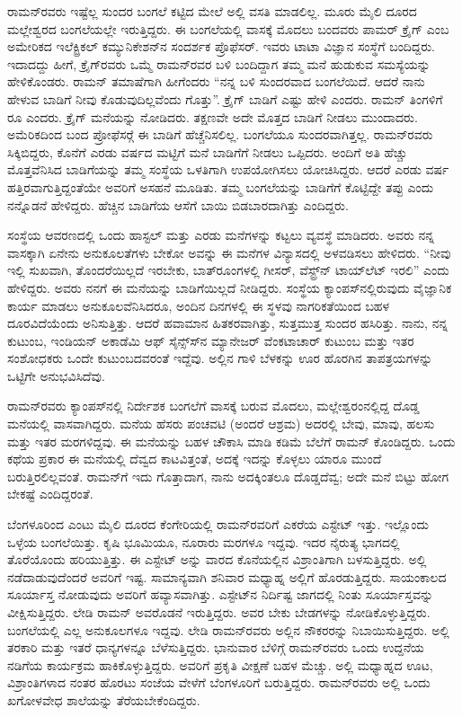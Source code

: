 ರಾಮನ್‍ರವರು ಇಷ್ಟೆಲ್ಲ ಸುಂದರ ಬಂಗಲೆ ಕಟ್ಟಿದ ಮೇಲೆ ಅಲ್ಲಿ ವಸತಿ ಮಾಡಲಿಲ್ಲ. ಮೂರು ಮೈಲಿ ದೂರದ ಮಲ್ಲೇಶ್ವರದ ಬಂಗಲೆಯಲ್ಲೇ ಇರುತ್ತಿದ್ದರು. ಈ ಬಂಗಲೆಯಲ್ಲಿ ವಾಸಕ್ಕೆ ಮೊದಲು ಬಂದವರು ಪಾಮರ್ ಕ್ರೈಗ್ ಎಂಬ ಅಮೇರಿಕದ ಇಲೆಕ್ಟ್ರಿಕಲ್ ಕಮ್ಯುನಿಕೇಶನ್‍ನ ಸಂದರ್ಶಕ ಪ್ರೊಫೆಸರ್. ಇವರು ಟಾಟಾ ವಿಜ್ಞಾನ ಸಂಸ್ಥೆಗೆ ಬಂದಿದ್ದರು. ಇದಾದದ್ದು ಹೀಗೆ, ಕ್ರೈಗ್‍ರವರು ಒಮ್ಮೆ ರಾಮನ್‍ರವರ ಬಳಿ ಬಂದಿದ್ದಾಗ ತಮ್ಮ ಮನೆ ಹುಡುಕುವ ಸಮಸ್ಯೆಯನ್ನು ಹೇಳಿಕೊಂಡರು. ರಾಮನ್ ತಮಾಷೆಗಾಗಿ ಹೀಗೆಂದರು “ನನ್ನ ಬಳಿ ಸುಂದರವಾದ ಬಂಗಲೆಯಿದೆ. ಆದರೆ ನಾನು ಹೇಳುವ ಬಾಡಿಗೆ ನೀವು ಕೊಡುವುದಿಲ್ಲವೆಂದು ಗೊತ್ತು”. ಕ್ರೈಗ್ ಬಾಡಿಗೆ ಎಷ್ಟು ಹೇಳಿ ಎಂದರು. ರಾಮನ್ ತಿಂಗಳಿಗೆ  ರೂ ಎಂದರು. ಕ್ರೈಗ್ ಮನೆಯನ್ನು ನೋಡಿದರು. ತಕ್ಷಣವೇ ಅದೇ ಮೊತ್ತದ ಬಾಡಿಗೆ ನೀಡಲು ಮುಂದಾದರು. ಅಮೆರಿಕದಿಂದ ಬಂದ ಪ್ರೋಫೆಸರ್‍ಗೆ ಈ ಬಾಡಿಗೆ ಹೆಚ್ಚೆನಿಸಲಿಲ್ಲ. ಬಂಗಲೆಯೂ ಸುಂದರವಾಗಿತ್ತಲ್ಲ. ರಾಮನ್‍ರವರು ಸಿಕ್ಕಿಬಿದ್ದರು, ಕೊನೆಗೆ ಎರಡು ವರ್ಷದ ಮಟ್ಟಿಗೆ ಮನೆ ಬಾಡಿಗೆಗೆ ನೀಡಲು ಒಪ್ಪಿದರು. ಅಂದಿಗೆ ಅತಿ ಹೆಚ್ಚು ಮೊತ್ತವೆನಿಸಿದ ಬಾಡಿಗೆಯನ್ನು ತಮ್ಮ ಸಂಸ್ಥೆಯ ಒಳತಿಗಾಗಿ ಉಪಯೋಗಿಸಲು ಯೋಚಿಸಿದ್ದರು. ಆದರೆ ಎರಡು ವರ್ಷ ಹತ್ತಿರವಾಗುತ್ತಿದ್ದಂತೆಯೇ ಅವರಿಗೆ ಅಸಹನೆ ಮೂಡಿತು. ತಮ್ಮ ಬಂಗಲೆಯನ್ನು ಬಾಡಿಗೆಗೆ ಕೊಟ್ಟಿದ್ದೇ ತಪ್ಪು ಎಂದು ನನ್ನೊಡನೆ ಹೇಳಿದ್ದರು. ಹೆಚ್ಚಿನ ಬಾಡಿಗೆಯ ಆಸೆಗೆ ಬಾಯಿ ಬಿಡಬಾರದಾಗಿತ್ತು ಎಂದಿದ್ದರು.

ಸಂಸ್ಥೆಯ ಆವರಣದಲ್ಲಿ ಒಂದು ಹಾಸ್ಟಲ್ ಮತ್ತು ಎರಡು ಮನೆಗಳನ್ನು ಕಟ್ಟಲು ವ್ಯವಸ್ಥೆ ಮಾಡಿದರು. ಅವರು ನನ್ನ ವಾಸಕ್ಕಾಗಿ ಏನೇನು ಅನುಕೂಲತೆಗಳು ಬೇಕೋ ಅವನ್ನು ಈ ಮನೆಗಳ ವಿನ್ಯಾಸದಲ್ಲಿ ಅಳವಡಿಸಲು ಹೇಳಿದರು. “ನೀವು ಇಲ್ಲಿ ಸುಖವಾಗಿ, ತೊಂದರೆಯಿಲ್ಲದೆ ಇರಬೇಕು, ಬಾತ್‍ರೂಂಗಳಲ್ಲಿ ಗೀಸರ್, ವೆಸ್ಟ್ರ್‌ನ್ ಟಾಯ್‍ಲೆಟ್ ಇರಲಿ” ಎಂದು ಹೇಳಿದ್ದರು. ಅವರು ನನಗೆ ಈ ಮನೆಯನ್ನು ಬಾಡಿಗೆಯಿಲ್ಲದೆ ನೀಡಿದ್ದರು. ಸಂಸ್ಥೆಯ ಕ್ಯಾಂಪಸ್‍ನಲ್ಲಿರುವುದು ವೈಜ್ಞಾನಿಕ ಕಾರ್ಯ ಮಾಡಲು ಅನುಕೂಲವೆನಿಸಿದರೂ, ಅಂದಿನ ದಿನಗಳಲ್ಲಿ ಈ ಸ್ಥಳವು ನಾಗರಿಕತೆಯಿಂದ ಬಹಳ ದೂರವಿದೆಯೆಂದು ಅನಿಸುತ್ತಿತ್ತು. ಆದರೆ ಹವಾಮಾನ ಹಿತಕರವಾಗಿತ್ತು, ಸುತ್ತಮುತ್ತ ಸುಂದರ ಹಸಿರಿತ್ತು. ನಾನು, ನನ್ನ ಕುಟುಂಬ, ಇಂಡಿಯನ್ ಅಕಾಡೆಮಿ ಆಫ್ ಸೈನ್ಸ್‌ಸ್‍ನ ಮ್ಯಾನೇಜರ್ ವೆಂಕಟಾಚಾರ್ ಕುಟುಂಬ ಮತ್ತು ಇತರ ಸಂಶೋಧಕರು ಒಂದೇ ಕುಟುಂಬದವರಂತೆ ಇದ್ದೆವು. ಅಲ್ಲಿನ ಗಾಳಿ ಬೆಳಕನ್ನು ಊರ ಹೊರಗಿನ ತಾಪತ್ರಯಗಳನ್ನು ಒಟ್ಟಿಗೇ ಅನುಭವಿಸಿದೆವು.

ರಾಮನ್‍ರವರು ಕ್ಯಾಂಪಸ್‍ನಲ್ಲಿ ನಿರ್ದೇಶಕ ಬಂಗಲೆಗೆ ವಾಸಕ್ಕೆ ಬರುವ ಮೊದಲು, ಮಲ್ಲೇಶ್ವರಂ\-ನಲ್ಲಿದ್ದ ದೊಡ್ಡ ಮನೆಯಲ್ಲಿ ವಾಸವಾಗಿದ್ದರು. ಮನೆಯ ಹೆಸರು ಪಂಚವಟಿ (ಅಂದರೆ ಆಶ್ರಮ) ಅದರಲ್ಲಿ ಬೇವು, ಮಾವು, ಹಲಸು ಮತ್ತು ಇತರ ಮರಗಳಿದ್ದವು. ಈ ಮನೆಯನ್ನು ಬಹಳ ಚೌಕಾಸಿ ಮಾಡಿ ಕಡಿಮೆ ಬೆಲೆಗೆ ರಾಮನ್ ಕೊಂಡಿದ್ದರು. ಒಂದು ಕಥೆಯ ಪ್ರಕಾರ ಈ ಮನೆಯಲ್ಲಿ ದೆವ್ವದ ಕಾಟವಿತ್ತಂತೆ, ಅದಕ್ಕೆ ಇದನ್ನು ಕೊಳ್ಳಲು ಯಾರೂ ಮುಂದೆ ಬರುತ್ತಿರಲಿಲ್ಲವಂತೆ. ರಾಮನ್‍ಗೆ ಇದು ಗೊತ್ತಾದಾಗ, ನಾನು ಅದಕ್ಕಿಂತಲೂ ದೊಡ್ಡದೆವ್ವ; ಅದೇ ಮನೆ ಬಿಟ್ಟು ಹೋಗ ಬೇಕಷ್ಟೆ ಎಂದಿದ್ದರಂತೆ.

ಬೆಂಗಳೂರಿಂದ ಎಂಟು ಮೈಲಿ ದೂರದ ಕೆಂಗೇರಿಯಲ್ಲಿ ರಾಮನ್‍ರವರಿಗೆ  ಎಕರೆಯ ಎಸ್ಟೇಟ್ ಇತ್ತು. ಇಲ್ಲೊಂದು ಒಳ್ಳೆಯ ಬಂಗಲೆಯಿತ್ತು. ಕೃಷಿ ಭೂಮಿಯೂ, ನೂರಾರು ಮರಗಳೂ ಇದ್ದವು. ಇದರ ನೈರುತ್ಯ ಭಾಗದಲ್ಲಿ ತೊರೆಯೊಂದು ಹರಿಯುತ್ತಿತ್ತು. ಈ ಎಸ್ಟೇಟ್ ಅನ್ನು ವಾರದ ಕೊನೆಯಲ್ಲಿನ ವಿಶ್ರಾಂತಿಗಾಗಿ ಬಳಸುತ್ತಿದ್ದರು. ಅಲ್ಲಿ ನಡೆದಾಡುವುದೆಂದರೆ ಅವರಿಗೆ ಇಷ್ಟ. ಸಾಮಾನ್ಯವಾಗಿ ಶನಿವಾರ ಮಧ್ಯಾಹ್ನ ಅಲ್ಲಿಗೆ ಹೊರಡುತ್ತಿದ್ದರು. ಸಾಯಂಕಾಲದ ಸೂರ್ಯಾಸ್ತ ನೋಡುವುದು ಅವರಿಗೆ ಹವ್ಯಾಸವಾಗಿತ್ತು. ಎಸ್ಟೇಟ್‍ನ ನಿರ್ದಿಷ್ಟ ಜಾಗದಲ್ಲಿ ನಿಂತು ಸೂರ್ಯಾಸ್ತವನ್ನು ವೀಕ್ಷಿಸುತ್ತಿದ್ದರು. ಲೇಡಿ ರಾಮನ್ ಅವರೊಡನೆ ಇರುತ್ತಿದ್ದರು. ಅವರ ಬೇಕು ಬೇಡಗಳನ್ನು ನೋಡಿಕೊಳ್ಳುತ್ತಿದ್ದರು. ಬಂಗಲೆಯಲ್ಲಿ ಎಲ್ಲ ಅನುಕೂಲಗಳೂ ಇದ್ದವು. ಲೇಡಿ ರಾಮನ್‍ರವರು ಅಲ್ಲಿನ ನೌಕರರನ್ನು ನಿಬಾಯಿಸುತ್ತಿದ್ದರು. ಅಲ್ಲಿ ತರಕಾರಿ ಮತ್ತು ಇತರೆ ಧಾನ್ಯಗಳನ್ನೂ ಬೆಳೆಸುತ್ತಿದ್ದರು. ಭಾನುವಾರ ಬೆಳಿಗ್ಗೆ ರಾಮನ್‍ರವರು ಒಂದು ಉದ್ದನೆಯ ನಡಿಗೆಯ ಕಾರ್ಯಕ್ರಮ ಹಾಕಿಕೊಳ್ಳುತ್ತಿದ್ದರು. ಅವರಿಗೆ ಪ್ರಕೃತಿ ವೀಕ್ಷಣೆ ಬಹಳ ಮೆಚ್ಚು. ಅಲ್ಲಿ ಮಧ್ಯಾಹ್ನದ ಊಟ, ವಿಶ್ರಾಂತಿಗಳಾದ ನಂತರ ಹೊರಟು ಸಂಜೆಯ ವೇಳೆಗೆ ಬೆಂಗಳೂರಿಗೆ ಬರುತ್ತಿದ್ದರು. ರಾಮನ್‍ರವರು ಅಲ್ಲಿ ಒಂದು ಖಗೋಳವೇಧ ಶಾಲೆಯನ್ನು ತೆರೆಯಬೇಕೆಂದಿದ್ದರು.


